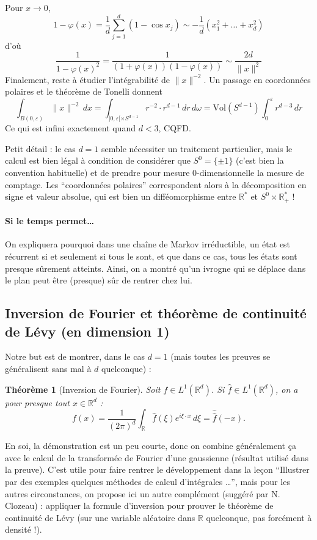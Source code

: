 \documentclass[a4paper, 11pt]{article}
\def\R{\mathbb{R}}
\def\Vol{\mathrm{Vol}}
\newtheorem*{theorem}{Théorème}
\begin{document}
Pour $x \to 0$,
\[ 1 - \varphi(x) = \frac{1}{d} \sum_{j=1}^d (1 - \cos x_j) \sim
  -\frac{1}{d}(x_1^2 + \ldots + x_d^2) \] d'où
\[\frac{1}{1 - \varphi(x)^2} = \frac{1}{(1 + \varphi(x))(1 - \varphi(x))} \sim
  \frac{2d}{\|x\|^2} \]
Finalement, reste à étudier l'intégrabilité de $\|x\|^{-2}$. Un passage en
coordonnées polaires et le théorème de Tonelli donnent
\[ \int_{B(0,\varepsilon)} \|x\|^{-2}\,dx = \int_{]0,\varepsilon[ \times S^{d-1}}
  r^{-2} \cdot r^{d-1}\,dr\,d\omega = \Vol(S^{d-1}) \int_0^\varepsilon
  r^{d-3}\,dr \]
Ce qui est infini exactement quand $d < 3$, CQFD.

Petit détail : le cas $d=1$ semble nécessiter un traitement particulier,
mais le calcul est bien légal à condition de considérer que $S^0 = \{\pm 1\}$
(c'est bien la convention habituelle) et de prendre pour mesure 0-dimensionnelle
la mesure de comptage. Les \enquote{coordonnées polaires} correspondent alors à
la décomposition en signe et valeur absolue, qui est bien un
difféomorphisme entre $\R^*$ et $S^0 \times \R_+^*$ !

\paragraph{Si le temps permet…} On expliquera pourquoi dans une chaîne de Markov
irréductible, un état est récurrent si et seulement si tous le sont, et que dans
ce cas, tous les états sont presque sûrement atteints. Ainsi, on a montré qu'un
ivrogne qui se déplace dans le plan peut être (presque) sûr de rentrer chez lui.

\newpage

\subsection{Inversion de Fourier et théorème de continuité de Lévy (en dimension 1)}

Notre but est de montrer, dans le cas $d = 1$ (mais toutes les preuves se
généralisent sans mal à $d$ quelconque) :

\begin{theorem}[Inversion de Fourier]
  Soit $f \in L^1(\R^d)$. Si $\hat{f} \in L^1(\R^d)$, on a pour presque
  tout $x \in \R^d$ :
\[ f(x) = \frac{1}{(2\pi)^d} \int_\R \hat{f}(\xi) e^{i\xi \cdot x} \,d\xi =
  \hat{\hat{f}}(-x). \]
\end{theorem}

En soi, la démonstration est un peu courte, donc on combine généralement ça avec
le calcul de la transformée de Fourier d'une gaussienne (résultat utilisé dans
la preuve). C'est utile pour faire rentrer le développement dans la leçon
\enquote{Illustrer par des exemples quelques méthodes de calcul d'intégrales …},
mais pour les autres circonstances, on propose ici un autre complément (suggéré
par N. Clozeau) : appliquer la formule d'inversion pour prouver le théorème de
continuité de Lévy (sur une variable aléatoire dans $\R$ quelconque, pas
forcément à densité !).
\end{document}
